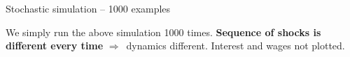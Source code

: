 \documentclass{beamer}
\newenvironment{mynumerate}
{\vfill\enumerate[nolistsep,itemsep=\fill,label=\arabic*.]}
  {\endenumerate}
\newcommand{\rarr}{$\Rightarrow$\ }
\begin{document}
\begin{frame}{Stochastic simulation -- 1000 examples}

  We simply run the above simulation 1000 times. \textbf{Sequence of shocks is different every time} \rarr dynamics different. Interest and wages not plotted.
\begin{center}
\vspace{-5mm}
\begin{figure}[h!]
\end{figure}
\end{center}

\end{frame}

%
\end{document}
